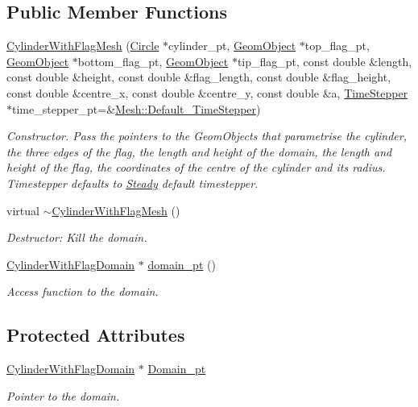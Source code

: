 \subsection*{Public Member Functions}
\begin{DoxyCompactItemize}
\item 
\hyperlink{classoomph_1_1CylinderWithFlagMesh_a6591a2b9fdcb8080c899e34b9c8277cd}{Cylinder\+With\+Flag\+Mesh} (\hyperlink{classoomph_1_1Circle}{Circle} $\ast$cylinder\+\_\+pt, \hyperlink{classoomph_1_1GeomObject}{Geom\+Object} $\ast$top\+\_\+flag\+\_\+pt, \hyperlink{classoomph_1_1GeomObject}{Geom\+Object} $\ast$bottom\+\_\+flag\+\_\+pt, \hyperlink{classoomph_1_1GeomObject}{Geom\+Object} $\ast$tip\+\_\+flag\+\_\+pt, const double \&length, const double \&height, const double \&flag\+\_\+length, const double \&flag\+\_\+height, const double \&centre\+\_\+x, const double \&centre\+\_\+y, const double \&a, \hyperlink{classoomph_1_1TimeStepper}{Time\+Stepper} $\ast$time\+\_\+stepper\+\_\+pt=\&\hyperlink{classoomph_1_1Mesh_a12243d0fee2b1fcee729ee5a4777ea10}{Mesh\+::\+Default\+\_\+\+Time\+Stepper})
\begin{DoxyCompactList}\small\item\em Constructor. Pass the pointers to the Geom\+Objects that parametrise the cylinder, the three edges of the flag, the length and height of the domain, the length and height of the flag, the coordinates of the centre of the cylinder and its radius. Timestepper defaults to \hyperlink{classoomph_1_1Steady}{Steady} default timestepper. \end{DoxyCompactList}\item 
virtual \hyperlink{classoomph_1_1CylinderWithFlagMesh_a04fb9a6ea7a70eb8dbfb83ef73ed7b48}{$\sim$\+Cylinder\+With\+Flag\+Mesh} ()
\begin{DoxyCompactList}\small\item\em Destructor\+: Kill the domain. \end{DoxyCompactList}\item 
\hyperlink{classoomph_1_1CylinderWithFlagDomain}{Cylinder\+With\+Flag\+Domain} $\ast$ \hyperlink{classoomph_1_1CylinderWithFlagMesh_abfaa03615a4a6f99ddc9100f739cb94f}{domain\+\_\+pt} ()
\begin{DoxyCompactList}\small\item\em Access function to the domain. \end{DoxyCompactList}\end{DoxyCompactItemize}
\subsection*{Protected Attributes}
\begin{DoxyCompactItemize}
\item 
\hyperlink{classoomph_1_1CylinderWithFlagDomain}{Cylinder\+With\+Flag\+Domain} $\ast$ \hyperlink{classoomph_1_1CylinderWithFlagMesh_a257b36fed6fb0d20d108a27c6a1c5f86}{Domain\+\_\+pt}
\begin{DoxyCompactList}\small\item\em Pointer to the domain. \end{DoxyCompactList}\end{DoxyCompactItemize}
